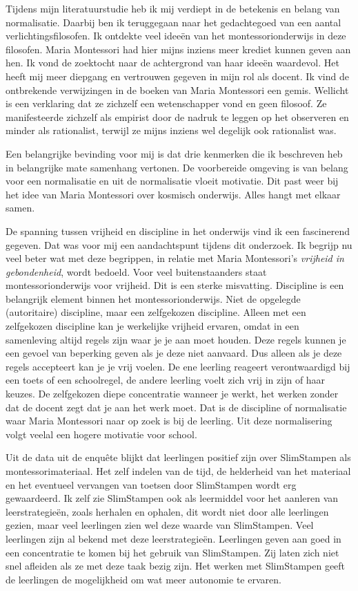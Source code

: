 \documentclass[12pt, a4paper]{article}
\begin{document}
Tijdens mijn literatuurstudie heb ik mij verdiept in de betekenis en belang van normalisatie. Daarbij ben ik teruggegaan naar het gedachtegoed van een aantal verlichtingsfilosofen. Ik ontdekte veel ideeën van het montessorionderwijs in deze filosofen. Maria Montessori had hier mijns inziens meer krediet kunnen geven aan hen. Ik vond de zoektocht naar de achtergrond van haar ideeën waardevol. Het heeft mij meer diepgang en vertrouwen gegeven in mijn rol als docent. Ik vind de ontbrekende verwijzingen in de boeken van Maria Montessori een gemis. Wellicht is een verklaring dat ze zichzelf een wetenschapper vond en geen filosoof. Ze manifesteerde zichzelf als empirist door de nadruk te leggen op het observeren en minder als rationalist, terwijl ze mijns inziens wel degelijk ook rationalist was.

Een belangrijke bevinding voor mij is dat drie kenmerken die ik beschreven heb in belangrijke mate samenhang vertonen. De voorbereide omgeving is van belang voor een normalisatie en uit de normalisatie vloeit motivatie. Dit past weer bij het idee van Maria Montessori over kosmisch onderwijs. Alles hangt met elkaar samen.

De spanning tussen vrijheid en discipline in het onderwijs vind ik een fascinerend gegeven. Dat was voor mij een aandachtspunt tijdens dit onderzoek. Ik begrijp nu veel beter wat met deze begrippen, in relatie met Maria Montessori's \emph{vrijheid in gebondenheid}, wordt bedoeld. Voor veel buitenstaanders staat montessorionderwijs voor vrijheid. Dit is een sterke misvatting. Discipline is een belangrijk element binnen het montessorionderwijs. Niet de opgelegde (autoritaire) discipline, maar een zelfgekozen discipline. Alleen met een zelfgekozen discipline kan je werkelijke vrijheid ervaren, omdat in een samenleving altijd regels zijn waar je je aan moet houden. Deze regels kunnen je een gevoel van beperking geven als je deze niet aanvaard. Dus alleen als je deze regels accepteert kan je je vrij voelen. De ene leerling reageert verontwaardigd bij een toets of een schoolregel, de andere leerling voelt zich vrij in zijn of haar keuzes. De zelfgekozen diepe concentratie wanneer je werkt, het werken zonder dat de docent zegt dat je aan het werk moet. Dat is de discipline of normalisatie waar Maria Montessori naar op zoek is bij de leerling. Uit deze normalisering volgt veelal een hogere motivatie voor school.  

Uit de data uit de enquête blijkt dat leerlingen positief zijn over SlimStampen als montessorimateriaal. Het zelf indelen van de tijd, de helderheid van het materiaal en het eventueel vervangen van toetsen door SlimStampen wordt erg gewaardeerd. Ik zelf zie SlimStampen ook als leermiddel voor het aanleren van leerstrategieën, zoals herhalen en ophalen, dit wordt niet door alle leerlingen gezien, maar veel leerlingen zien wel deze waarde van SlimStampen. Veel leerlingen zijn al bekend met deze leerstrategieën. Leerlingen geven aan goed in een concentratie te komen bij het gebruik van SlimStampen. Zij laten zich niet snel afleiden als ze met deze taak bezig zijn. Het werken met SlimStampen geeft de leerlingen de mogelijkheid om wat meer autonomie te ervaren.
\end{document}
